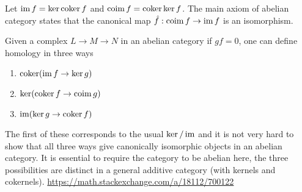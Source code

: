 \begin{remark}[homology]
	Let $\operatorname{im} f = \ker \operatorname{coker} f$ and $\operatorname{coim} f= \operatorname{coker} \ker f$. The main axiom of abelian category states that the canonical map $\hat{f}: \operatorname{coim} f \to \operatorname{im} f$ is an isomorphism.
	\begin{center}
	\end{center}
	
	Given a complex $L \to M \to N$ in an abelian category if $gf = 0$, one can define homology in three ways
	\begin{center}
	\end{center}
	
	\begin{enumerate}
		\item $\operatorname{coker} (\operatorname{im} f \to \ker g)$
		\item $\ker (\operatorname{coker} f \to \operatorname{coim} g)$
		\item $\operatorname{im} (\ker g \to \operatorname{coker} f)$
	\end{enumerate}

	The first of these corresponds to the usual $\ker / \operatorname{im}$ and it is not very hard to show that all three ways give canonically isomorphic objects in an abelian category. It is essential to require the category to be abelian here, the three possibilities are distinct in a general additive category (with kernels and cokernels).
	\url{https://math.stackexchange.com/a/18112/700122}
\end{remark}



